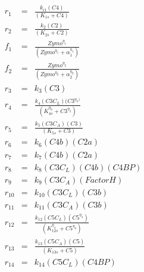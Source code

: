 \documentclass[12pt]{article}
\begin{document}
\begin{eqnarray}
	r_{1} &=& \frac{k_{i1}(C4)}{(K_{1s} + C4)} \\
	r_{2} &=& \frac{k_{2}(C2)}{(K_{2s} + C2)} \\
	f_{1} &=& \frac{Zymo^{\eta_{1}}}{(Zymo^{\eta_{1}} + \alpha_{1}^{\eta_{1}})} \\
	f_{2} &=& \frac{Zymo^{\eta_{2}}}{(Zymo^{\eta_{2}} + \alpha_{2}^{\eta_{2}})} \\
	r_{3} &=& k_{3}(C3) \\
	r_{4} &=& \frac{k_{4}(C3C_{L})(C3^{\eta_{3})}}{(K_{4s}^{\eta_{3}} + C3^{\eta_{3}})}  \\
	r_{5} &=& \frac{k_{5}(C3C_{A})(C3)}{(K_{5s} + C3)} \\
	r_{6} &=& k_{6}(C4b)(C2a) \\
	r_{7} &=& k_{7}(C4b)(C2a) \\
	r_{8} &=& k_{8}(C3C_{L})(C4b)(C4BP) \\
	r_{9} &=& k_{9}(C3C_{A})(FactorH) \\
	r_{10} &=& k_{10}(C3C_{L})(C3b) \\
	r_{11} &=& k_{11}(C3C_{A})(C3b) \\
	r_{12} &=& \frac{k_{12}(C5C_{L})(C5^{\eta_{4}})}{(K_{12s}^{\eta_{4}} + C5^{\eta_{4}})} \\
	r_{13} &=& \frac{k_{13}(C5C_{A})(C5)}{(K_{13s} + C5)} \\
	r_{14} &=& k_{14}(C5C_{L})(C4BP)
\end{eqnarray}

\end{document}
